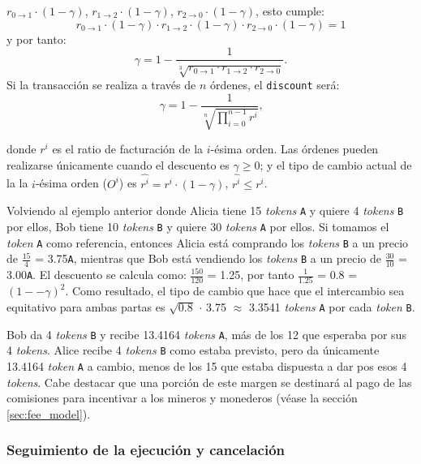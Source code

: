 \documentclass[UTF8,nofonts]{article}
\begin{document}
\begin{multicols}{2}
$r_{0\rightarrow 1} \cdot (1-\gamma)$, $r_{1\rightarrow 2} \cdot (1-\gamma)$, $r_{2 \rightarrow 0} \cdot (1-\gamma)$, esto cumple: 
\begin{equation}
r_{0\rightarrow 1} \cdot (1-\gamma)\cdot r_{1\rightarrow 2} \cdot (1-\gamma) \cdot r_{2 \rightarrow 0} \cdot (1-\gamma) = 1
\end{equation}
y por tanto: 
\begin{equation}
\gamma = 1- \frac{1}{\sqrt[3]{r_{0\rightarrow 1} \cdot r_{1\rightarrow 2} \cdot r_{2\rightarrow 0}}}\text{.}
\end{equation}
Si la transacción se realiza a través de $n$ órdenes, el \texttt{discount} será: 
\begin{equation}
\gamma = 1- \frac{1}{\sqrt[n]{\prod_{i=0}^{n-1} r^i}} \text{,}
\end{equation}

donde $r^i$ es el ratio de facturación de la $i$-ésima orden. Las órdenes pueden realizarse únicamente cuando el descuento es $\gamma \ge 0$; y el tipo de cambio actual de la la $i$-ésima orden ($O^i$) es $\hat{r^i} = r^i \cdot (1-\gamma)$, $\hat{r^i}\le r^i$.

Volviendo al ejemplo anterior donde Alicia tiene 15 \textit{tokens} \verb|A| y quiere 4 \textit{tokens} \verb|B| por ellos, Bob tiene 10 \textit{tokens} \verb|B| y quiere 30 \textit{tokens} \verb|A| por ellos. Si tomamos el \textit{token} \verb|A| como referencia, entonces Alicia está comprando los \textit{tokens} \verb|B| a un precio de $\frac{15}{4}$ = 3.75\verb|A|, mientras que Bob está vendiendo los \textit{tokens} \verb|B| a un precio de $\frac{30}{10}$ = 3.00\verb|A|. El descuento se calcula como: $\frac{150}{120}$ = 1.25, por tanto $\frac{1}{1.25}$ = 0.8 = $(1 −- \gamma)^2$. Como resultado, el tipo de cambio que hace que el intercambio sea equitativo para ambas partas es $\sqrt{0.8}$ $\cdot$ 3.75 $\approx$ 3.3541 \textit{tokens} \verb|A| por cada \textit{token} \verb|B|.

Bob da 4 \textit{tokens} \verb|B| y recibe 13.4164 \textit{tokens} \verb|A|, más de los 12 que esperaba por sus 4 \textit{tokens}. Alice recibe 4 \textit{tokens} \verb|B| como estaba previsto, pero da únicamente 13.4164 \textit{token} \verb|A| a cambio, menos de los 15 que estaba dispuesta a dar pos esos 4 \textit{tokens}.
Cabe destacar que una porción de este margen se destinará al pago de las comisiones para incentivar a los mineros y monederos (véase la sección \ref{sec:fee_model}).


\subsubsection{Seguimiento de la ejecución y cancelación}


\end{multicols}
\end{document}
